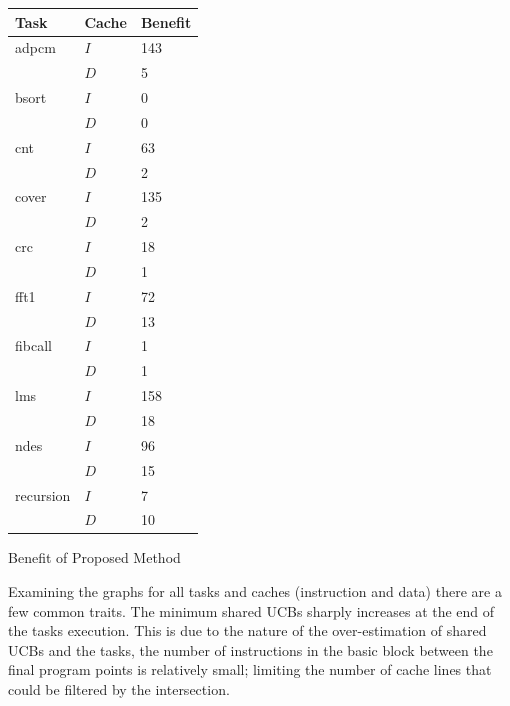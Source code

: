 \begin{minipage}{\linewidth}
\centering
    \begin{tabular}{l l | l}
      Task & Cache & Benefit \\
      \hline

      adpcm & ${I}$ & 143 \\
            & ${D}$ & 5 \\
      \hline

      bsort & ${I}$ & 0 \\ 
            & ${D}$ & 0 \\
      \hline

      cnt & ${I}$ & 63 \\
          & ${D}$ & 2 \\
      \hline

      cover & ${I}$ & 135 \\
            & ${D}$ & 2 \\
      \hline

      crc & ${I}$ & 18 \\
          & ${D}$ & 1 \\
      \hline

      fft1 & ${I}$ & 72 \\
           & ${D}$ & 13 \\
      \hline

      fibcall & ${I}$ & 1 \\
              & ${D}$ & 1 \\
      \hline

      lms & ${I}$ & 158 \\
          & ${D}$ & 18 \\
      \hline

      ndes & ${I}$ & 96 \\
           & ${D}$ & 15 \\
      \hline

      recursion & ${I}$ & 7 \\
                & ${D}$ & 10 \\
      \hline

    \end{tabular}
    \bigskip

    Benefit of Proposed Method
    \bigskip
\end{minipage}

Examining the graphs for all tasks and caches (instruction and data)
there are a few common traits. The minimum shared UCBs sharply
increases at the end of the tasks execution. This is due to the nature
of the over-estimation of shared UCBs and the tasks, the number of
instructions in the basic block between the final program points is
relatively small; limiting the number of cache lines that could be
filtered by the intersection.

